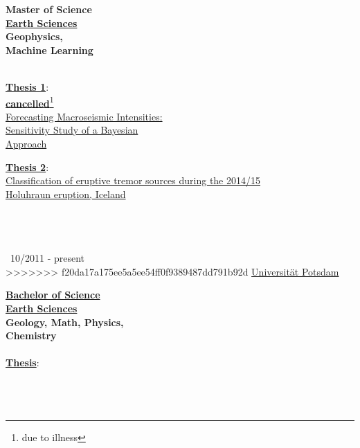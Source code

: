\documentclass{article}
\begin{document}
\begin{minipage}[t]{0.69\textwidth}
\begin{minipage}{0.34\textwidth}
\begin{minipage}[t]{0.7\textwidth}
		\begin{minipage}[t]{0.38\textwidth}
	\textbf{\large \color{pblue}\faHourglassHalf\hspace{1mm}Master of Science}\\
	\textbf{\underline{Earth Sciences}}\\
	\textbf{Geophysics,\\ Machine Learning}\\\\
	\begin{minipage}[t]{0.52\textwidth}
	\textbf{\underline{Thesis 1}}:\\
	\textbf{\underline{cancelled}}\footnote{due to illness}\\
	\href{https://github.com/silvioschwarz/master-thesis}{Forecasting Macroseismic Intensities:\\Sensitivity Study of a Bayesian\\ Approach}
	\end{minipage}
	\hfill
	\begin{minipage}[t]{0.45\textwidth}
	\textbf{\underline{Thesis 2}}:\\
	\href{https://github.com/silvioschwarz/master-thesis}{Classification of eruptive tremor sources during the 2014/15\\ Holuhraun eruption, Iceland}
	\end{minipage}
	\\\\\\\
		10/2011 - present\\
>>>>>>> f20da17a175ee5a5ee54ff0f9389487dd791b92d
	\href{https://www.uni-potsdam.de/}{\color{pblue}Universität Potsdam}
		\end{minipage}		
		\hfill
		\begin{minipage}[t]{0.33\textwidth}
	\textbf{\href{https://www.dropbox.com/s/297g1chiby8mrd3/Bachelor-Certificate.pdf?dl=0}{\large \color{pblue}\faGraduationCap\hspace{1mm}Bachelor of Science}}\\
	\textbf{\underline{Earth Sciences}}\\
	\textbf{Geology, Math, Physics,\\ Chemistry}\\\\
	\textbf{\underline{Thesis}}:\\
	\href{https://www.dropbox.com/s/3kngo4hpb0c47ww/Bachelorarbeit.pdf?dl=0}{}\\\\\\

\end{minipage}
\end{minipage}
\end{minipage}
\end{minipage}
\end{document}

